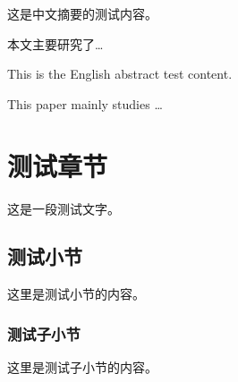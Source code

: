 \documentclass[degree=bachelor]{sduthesis}
\begin{document}
\begin{cnabstract}
这是中文摘要的测试内容。

本文主要研究了\ldots
\end{cnabstract}

\begin{enabstract}
This is the English abstract test content.

This paper mainly studies \ldots
\end{enabstract}

\tableofcontents

\chapter{测试章节}
这是一段测试文字。

\section{测试小节}
这里是测试小节的内容。

\subsection{测试子小节}
这里是测试子小节的内容。
\end{document}
